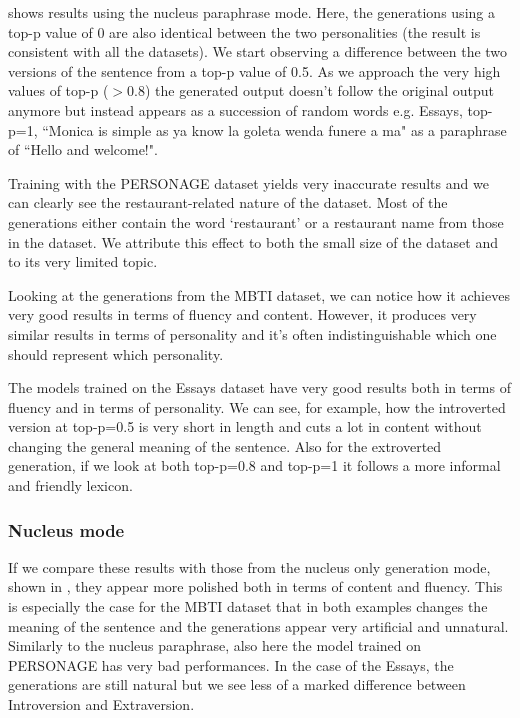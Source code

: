 \documentclass[nomenclature, english, biblatex]{kththesis}
\begin{document}
 shows results using the nucleus paraphrase mode. Here, the generations using a top-p value of 0 are also identical between the two personalities (the result is consistent with all the datasets). We start observing a difference between the two versions of the sentence from a top-p value of 0.5. As we approach the very high values of top-p ($>0.8$) the generated output doesn't follow the original output anymore but instead appears as a succession of random words e.g. Essays, top-p=1, ``Monica is simple as ya know la goleta wenda funere a ma" as a paraphrase of ``Hello and welcome!". 

Training with the PERSONAGE dataset yields very inaccurate results and we can clearly see the restaurant-related nature of the dataset. Most of the generations either contain the word `restaurant' or a restaurant name from those in the dataset. We attribute this effect to both the small size of the dataset and to its very limited topic.

Looking at the generations from the MBTI dataset, we can notice how it achieves very good results in terms of fluency and content. However, it produces very similar results in terms of personality and it's often indistinguishable which one should represent which personality.

The models trained on the Essays dataset have very good results both in terms of fluency and in terms of personality. We can see, for example, how the introverted version at top-p=0.5 is very short in length and cuts a lot in content without changing the general meaning of the sentence. Also for the extroverted generation, if we look at both top-p=0.8 and top-p=1 it follows a more informal and friendly lexicon.

\subsubsection{Nucleus mode}
If we compare these results with those from the nucleus only generation mode, shown in , they appear more polished both in terms of content and fluency. This is especially the case for the MBTI dataset that in both examples changes the meaning of the sentence and the generations appear very artificial and unnatural. Similarly to the nucleus paraphrase, also here the model trained on PERSONAGE has very bad performances. In the case of the Essays, the generations are still natural but we see less of a marked difference between Introversion and Extraversion.
\end{document}

